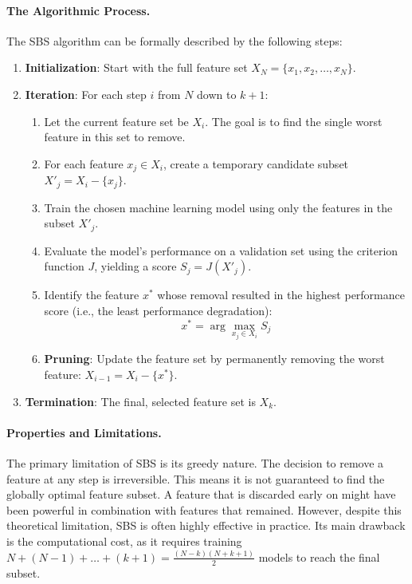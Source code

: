 \paragraph{The Algorithmic Process.} The SBS algorithm can be formally described by the following steps:
\begin{enumerate}
    \item \textbf{Initialization}: Start with the full feature set $X_N = \{x_1, x_2, \dots, x_N\}$.
    \item \textbf{Iteration}: For each step $i$ from $N$ down to $k+1$:
    \begin{enumerate}
        \item Let the current feature set be $X_i$. The goal is to find the single worst feature in this set to remove.
        \item For each feature $x_j \in X_i$, create a temporary candidate subset $X'_{j} = X_i - \{x_j\}$.
        \item Train the chosen machine learning model using only the features in the subset $X'_{j}$.
        \item Evaluate the model's performance on a validation set using the criterion function $J$, yielding a score $S_j = J(X'_{j})$.
        \item Identify the feature $x^*$ whose removal resulted in the highest performance score (i.e., the least performance degradation): 
        $$ x^* = \arg\max_{x_j \in X_i} S_j $$
        \item \textbf{Pruning}: Update the feature set by permanently removing the worst feature: $X_{i-1} = X_i - \{x^*\}$.
    \end{enumerate}
    \item \textbf{Termination}: The final, selected feature set is $X_k$.
\end{enumerate}
\paragraph{Properties and Limitations.} The primary limitation of SBS is its greedy nature. The decision to remove a feature at any step is irreversible. This means it is not guaranteed to find the globally optimal feature subset. A feature that is discarded early on might have been powerful in combination with features that remained. However, despite this theoretical limitation, SBS is often highly effective in practice. Its main drawback is the computational cost, as it requires training $N + (N-1) + \dots + (k+1) = \frac{(N-k)(N+k+1)}{2}$ models to reach the final subset.

